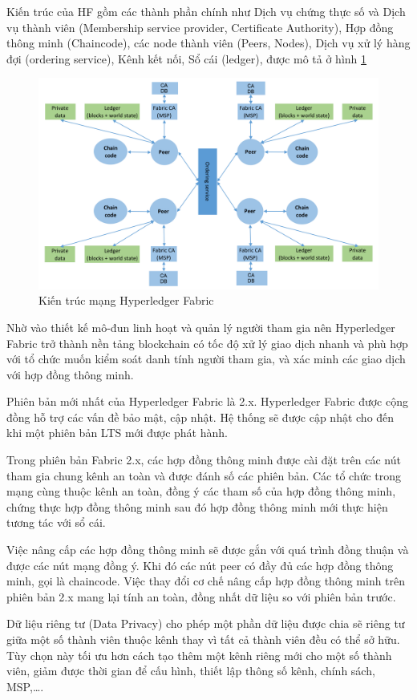 Kiến trúc của HF gồm các thành phần chính như Dịch vụ chứng thực số và Dịch vụ thành viên (Membership service provider, Certificate Authority), Hợp đồng thông minh (Chaincode), các node thành viên (Peers, Nodes), Dịch vụ xử lý hàng đợi (ordering service), Kênh kết nối, Sổ cái (ledger), được mô tả ở hình \ref{fig:hlf_arch} 
\begin{figure}[htbp]
\centering
\includegraphics[width=.9\linewidth]{img/hlf_arch.png}
\caption{Kiến trúc mạng Hyperledger Fabric}
\label{fig:hlf_arch}
\end{figure}

Nhờ vào thiết kế mô-đun linh hoạt và quản lý người tham gia nên Hyperledger Fabric trở thành nền tảng blockchain có tốc độ xử lý giao dịch nhanh và phù hợp với tổ chức muốn kiểm soát danh tính người tham gia, và xác minh các giao dịch với hợp đồng thông minh.

Phiên bản mới nhất của Hyperledger Fabric là 2.x. Hyperledger Fabric được cộng đồng hỗ trợ các vấn đề bảo mật, cập nhật. Hệ thống sẽ được cập nhật cho đến khi một phiên bản LTS mới được phát hành.

Trong phiên bản Fabric 2.x, các hợp đồng thông minh được cài đặt trên các nút tham gia chung kênh an toàn và được đánh số các phiên bản. Các tổ chức trong mạng cùng thuộc kênh an toàn, đồng ý các tham số của hợp đồng thông minh, chứng thực hợp đồng thông minh sau đó hợp đồng thông minh mới thực hiện tương tác với sổ cái. 

Việc nâng cấp các hợp đồng thông minh sẽ được gắn với quá trình đồng thuận và được các nút mạng đồng ý. Khi đó các nút peer có đầy đủ các hợp đồng thông minh, gọi là chaincode. Việc thay đổi cơ chế nâng cấp hợp đồng thông minh trên phiên bản 2.x mang lại tính an toàn, đồng nhất dữ liệu so với phiên bản trước.

Dữ liệu riêng tư (Data Privacy) cho phép một phần dữ liệu được chia sẽ riêng tư giữa một số thành viên thuộc kênh thay vì tất cả thành viên đều có thể sở hữu. Tùy chọn này tối ưu hơn cách tạo thêm một kênh riêng mới cho một số thành viên, giảm được thời gian để cấu hình, thiết lập thông số kênh, chính sách, MSP,\ldots. 

